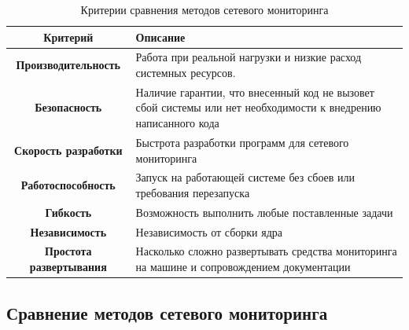 \begin{table}[ht]
	\begin{center}
		\begin{threeparttable}
			\caption{\label{tb:criteria}Критерии сравнения методов сетевого мониторинга}
			\begin{tabular}{|c|p{8cm}|}
				\hline
				\textbf{Критерий} & \textbf{Описание} \\ \hline
				\textbf{Производительность} & Работа при реальной нагрузки и низкие расход системных ресурсов. \\ \hline
				\textbf{Безопасность} & Наличие гарантии, что внесенный код не вызовет сбой системы или нет необходимости к внедрению написанного кода \\ \hline
				\textbf{Скорость разработки} & Быстрота разработки программ для сетевого мониторинга \\ \hline
				\textbf{Работоспособность} & Запуск на работающей системе без сбоев или требования перезапуска \\ \hline
				\textbf{Гибкость} & Возможность выполнить любые поставленные задачи \\ \hline
				\textbf{Независимость} & Независимость от сборки ядра \\ \hline
				\textbf{Простота развертывания} & Насколько сложно развертывать средства мониторинга на машине и сопровождением документации \\ \hline
			\end{tabular}
		\end{threeparttable}
	\end{center}
\end{table}

\clearpage

\subsection{Сравнение методов сетевого мониторинга}

